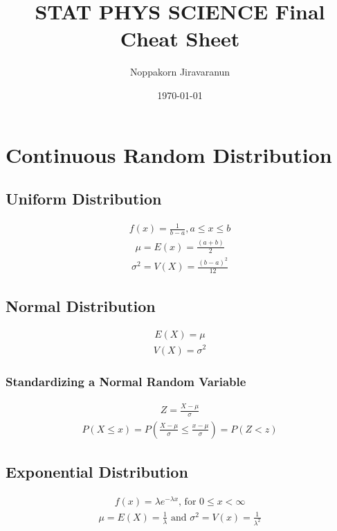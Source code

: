 \documentclass[twocolumn]{article}
\title{STAT PHYS SCIENCE Final Cheat Sheet}
\author{Noppakorn Jiravaranun}
\date{\today}
\begin{document}
\maketitle

\section{Continuous Random Distribution}
\subsection{Uniform Distribution}
\begin{align*}
    f(x) = \frac{1}{b-a}, a \leq x \leq b
\end{align*}
\begin{align*}
    \mu = E(x) = \frac{(a+b)}{2}
\end{align*}
\begin{align*}
    \sigma^{2} = V(X) = \frac{(b-a)^{2}}{12}
\end{align*}
\subsection{Normal Distribution}
\begin{align*}
    E(X) = \mu
\end{align*}
\begin{align*}
    V(X) = \sigma^{2}
\end{align*}
\subsubsection{Standardizing a Normal Random Variable}
\begin{align*}
    Z = \frac{X-\mu}{\sigma}
\end{align*}
\begin{align*}
    P(X \leq x) = P(\frac{X-\mu}{\sigma} \leq \frac{x-\mu}{\sigma}) = P(Z < z)
\end{align*}
\subsection{Exponential Distribution}
\begin{align*}
    f(x) = \lambda e^{-\lambda x} \text{, for } 0 \leq x < \infty
\end{align*}
\begin{align*}
    \mu = E(X) = \frac{1}{\lambda} \text {  and  }
    \sigma^{2} = V(x) = \frac{1}{\lambda^{2}}
\end{align*}
\end{document}
